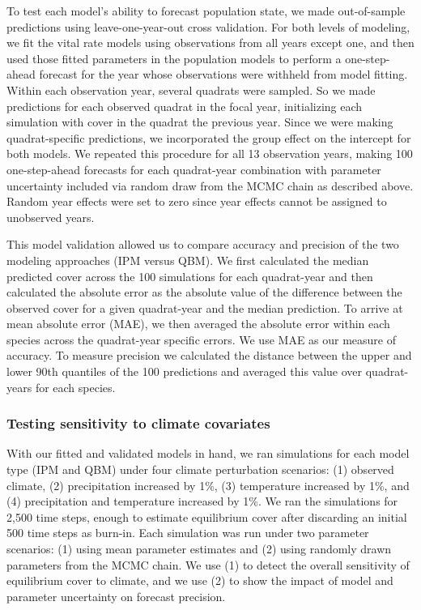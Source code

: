 \documentclass[12pt,]{article}
\begin{document}
To test each model's ability to forecast population state, we made
out-of-sample predictions using leave-one-year-out cross validation. For
both levels of modeling, we fit the vital rate models using observations
from all years except one, and then used those fitted parameters in the
population models to perform a one-step-ahead forecast for the year
whose observations were withheld from model fitting. Within each
observation year, several quadrats were sampled. So we made predictions
for each observed quadrat in the focal year, initializing each
simulation with cover in the quadrat the previous year. Since we were
making quadrat-specific predictions, we incorporated the group effect on
the intercept for both models. We repeated this procedure for all 13
observation years, making 100 one-step-ahead forecasts for each
quadrat-year combination with parameter uncertainty included via random
draw from the MCMC chain as described above. Random year effects were
set to zero since year effects cannot be assigned to unobserved years.

This model validation allowed us to compare accuracy and precision of
the two modeling approaches (IPM versus QBM). We first calculated the
median predicted cover across the 100 simulations for each quadrat-year
and then calculated the absolute error as the absolute value of the
difference between the observed cover for a given quadrat-year and the
median prediction. To arrive at mean absolute error (MAE), we then
averaged the absolute error within each species across the quadrat-year
specific errors. We use MAE as our measure of accuracy. To measure
precision we calculated the distance between the upper and lower 90th
quantiles of the 100 predictions and averaged this value over
quadrat-years for each species.

\subsubsection{Testing sensitivity to climate
covariates}\label{testing-sensitivity-to-climate-covariates}

With our fitted and validated models in hand, we ran simulations for
each model type (IPM and QBM) under four climate perturbation scenarios:
(1) observed climate, (2) precipitation increased by 1\%, (3)
temperature increased by 1\%, and (4) precipitation and temperature
increased by 1\%. We ran the simulations for 2,500 time steps, enough to
estimate equilibrium cover after discarding an initial 500 time steps as
burn-in. Each simulation was run under two parameter scenarios: (1)
using mean parameter estimates and (2) using randomly drawn parameters
from the MCMC chain. We use (1) to detect the overall sensitivity of
equilibrium cover to climate, and we use (2) to show the impact of model
and parameter uncertainty on forecast precision.
\end{document}
